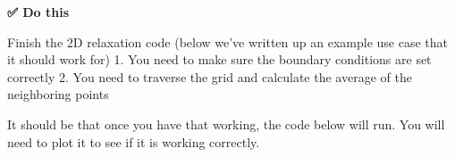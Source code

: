 \begin{Shaded}
\begin{Highlighting}[]
        \CommentTok{\#\#\#\#\#\#\#\#\#\#\#\#\#\#\#\#\#\#\#\#\#\#}
        \AlertTok{\#\#\#}
        \CommentTok{\#\#\#\#\#\#\#\#\#\#\#\#\#\#\#\#\#\#\#\#\#\#}
        
\OperatorTok{=}\OperatorTok{{-}}
        
\OperatorTok{+=} 
        
        \OperatorTok{\%}\OperatorTok{==} \NormalTok{:}
            \NormalTok{(}\SpecialCharTok{\{}\SpecialCharTok{\}}\SpecialCharTok{\{}\SpecialCharTok{\}}\NormalTok{)}
    
\end{Highlighting}
\end{Shaded}

\textbf{✅ Do this}

Finish the 2D relaxation code (below we've written up an example use
case that it should work for) 1. You need to make sure the boundary
conditions are set correctly 2. You need to traverse the grid and
calculate the average of the neighboring points

It should be that once you have that working, the code below will run.
You will need to plot it to see if it is working correctly.

